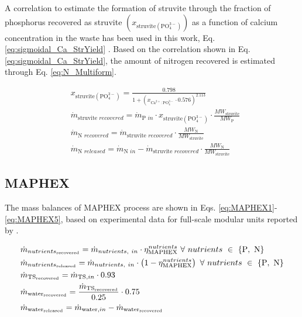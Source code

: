 \begin{refsection}[referencesApD]
A correlation
to estimate the formation of struvite through the fraction of phosphorus recovered as struvite $\left(x_{\text{struvite} \left(\text{PO}_{4}^{3-}\right) }\right) $ as a function of calcium concentration in the waste has been used in this work, Eq. \ref{eq:sigmoidal_Ca_StrYield} \citep{martin2020model}.
Based on the correlation shown in Eq. \ref{eq:sigmoidal_Ca_StrYield}, the amount of nitrogen recovered is estimated through Eq. \ref{eq:N_Multiform}.

\begin{align}
& x_{\text{struvite} \left(\text{PO}_{4}^{3-}\right) }= \frac{0.798}{1+\left(x_{\text{Ca}^{2+}:\text{PO}_{4}^{3-}} \cdot 0.576\right)^{2.113}} \label{eq:sigmoidal_Ca_StrYield}
\\
& \dot{m}_{\text{struvite } recovered} = \dot{m}_{\text{P } in}  \cdot x_{\text{struvite} \left(\text{PO}_{4}^{3-}\right) } \cdot \frac{MW_{\text{struvite}}}{MW_{\text{P}}}
\\
& \dot{m}_{\text{N } recovered} =  \dot{m}_{\text{struvite } recovered} \cdot \frac{MW_{\text{N}}}{MW_{\text{struvite}}} \label{eq:N_Multiform}
\\ 
& \dot{m}_{\text{N } released} = \dot{m}_{\text{N } in} - \dot{m}_{\text{struvite } recovered} \cdot \frac{MW_{\text{N}}}{MW_{\text{struvite}}}
\end{align} 

\subsection{MAPHEX}
The mass balances of MAPHEX process are shown in Eqs. \ref{eq:MAPHEX1}-\ref{eq:MAPHEX5}, based on experimental data for full-scale modular units reported by \citet{church_versatility2018}.

\begin{align}
& \dot{m}_{nutrients_\text{recovered}} = \dot{m}_{nutrients, \ in} \cdot \eta_{\text{MAPHEX}}^{{nutrients}} \ \forall \ nutrients \ \in \ \{\text{P}, \ \text{N}\} \label{eq:MAPHEX1}
\\
& \dot{m}_{nutrients_\text{released}} = \dot{m}_{nutrients, \ in} \cdot \left(1- \eta_{\text{MAPHEX}}^{{nutrients}}\right) \ \forall \ nutrients \ \in \ \{\text{P}, \ \text{N}\} 
\label{eq:MAPHEX2}
\\
& \dot{m}_{\text{TS\textsubscript{recovered}}} = \dot{m}_{\text{TS}, in} \cdot 0.93 \label{eq:MAPHEX3}
\\
& \dot{m}_{\text{water\textsubscript{recovered}}} = \frac{\dot{m}_{\text{TS\textsubscript{recovered}}}}{0.25} \cdot 0.75 \label{eq:MAPHEX4}
\\
& \dot{m}_{\text{water\textsubscript{released}}} = \dot{m}_{\text{water}, in} - \dot{m}_{\text{water\textsubscript{recovered}}} \label{eq:MAPHEX5}
\end{align}


\end{refsection}
